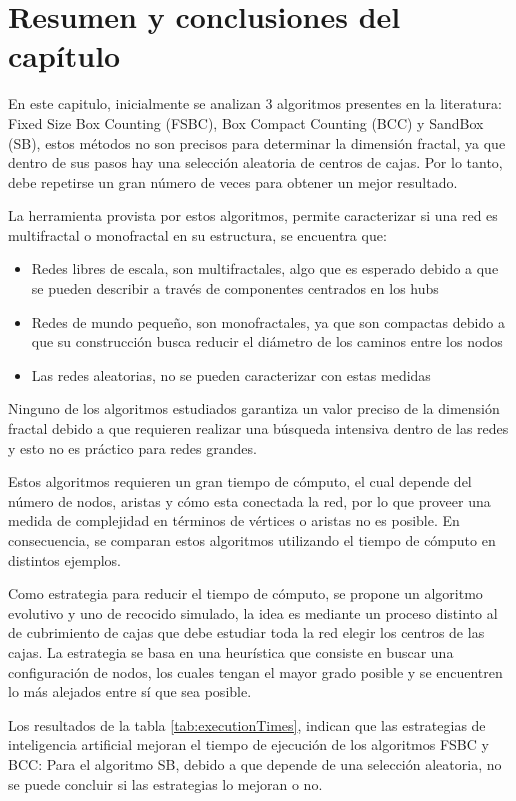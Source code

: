 \newpage
\section{Resumen y conclusiones del capítulo}

En este capitulo, inicialmente se analizan 3 algoritmos presentes en la literatura: Fixed Size Box Counting (FSBC), Box Compact Counting (BCC) y SandBox (SB), estos métodos no son precisos para determinar la dimensión fractal, ya que dentro de sus pasos hay una selección aleatoria de centros de cajas. Por lo tanto, debe repetirse un gran número de veces para obtener un mejor resultado.

La herramienta provista por estos algoritmos, permite caracterizar si una red es multifractal o monofractal en su estructura, se encuentra que:

\begin{itemize}
    \item Redes libres de escala, son multifractales, algo que es esperado debido a que se pueden describir a través de componentes centrados en los hubs
    \item Redes de mundo pequeño, son monofractales, ya que son compactas debido a que su construcción busca reducir el diámetro de los caminos entre los nodos
    \item Las redes aleatorias, no se pueden caracterizar con estas medidas
\end{itemize}

Ninguno de los algoritmos estudiados garantiza un valor preciso de la dimensión fractal debido a que requieren realizar una búsqueda intensiva dentro de las redes y esto no es práctico para redes grandes.

Estos algoritmos requieren un gran tiempo de cómputo, el cual depende del número de nodos, aristas y cómo esta conectada la red, por lo que proveer una medida de complejidad en términos de vértices o aristas no es posible. En consecuencia, se comparan estos algoritmos utilizando el tiempo de cómputo en distintos ejemplos.

Como estrategia para reducir el tiempo de cómputo, se propone un algoritmo evolutivo y uno de recocido simulado, la idea es mediante un proceso distinto al de cubrimiento de cajas que debe estudiar toda la red elegir los centros de las cajas. La estrategia se basa en una heurística que consiste en buscar una configuración de nodos, los cuales tengan el mayor grado posible y se encuentren lo más alejados entre sí que sea posible.

Los resultados de la tabla \ref{tab:executionTimes}, indican que las estrategias de inteligencia artificial mejoran el tiempo de ejecución de los algoritmos FSBC y BCC: Para el algoritmo SB, debido a que depende de una selección aleatoria, no se puede concluir si las estrategias lo mejoran o no.